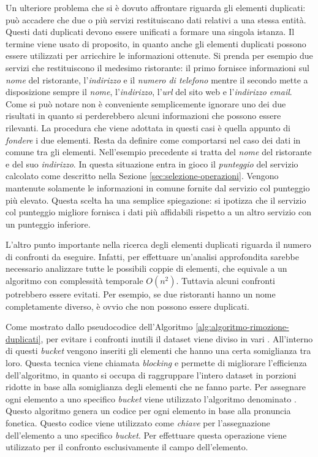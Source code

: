 Un ulteriore problema che si è dovuto affrontare riguarda gli elementi duplicati: può accadere che due o più servizi restituiscano dati relativi a una stessa entità. Questi dati duplicati devono essere unificati a formare una singola istanza. Il termine  viene usato di proposito, in quanto anche gli elementi duplicati possono essere utilizzati per arricchire le informazioni ottenute. Si prenda per esempio due servizi che restituiscono il medesimo ristorante: il primo fornisce informazioni sul \emph{nome} del ristorante, l'\emph{indirizzo} e il \emph{numero di telefono} mentre il secondo mette a disposizione sempre il \emph{nome}, l'\emph{indirizzo}, l'\emph{url} del sito web e l'\emph{indirizzo email}. Come si può notare non è conveniente semplicemente ignorare uno dei due risultati in quanto si perderebbero alcuni informazioni che possono essere rilevanti. La procedura che viene adottata in questi casi è quella appunto di \emph{fondere} i due elementi. Resta da definire come comportarsi nel caso dei dati in comune tra gli elementi. Nell'esempio precedente si tratta del \emph{nome} del ristorante e del suo \emph{indirizzo}. In questa situazione entra in gioco il \emph{punteggio} del servizio calcolato come descritto nella Sezione \ref{sec:selezione-operazioni}. Vengono mantenute solamente le informazioni in comune fornite dal servizio col punteggio più elevato. Questa scelta ha una semplice spiegazione: si ipotizza che il servizio col punteggio migliore fornisca i dati più affidabili rispetto a un altro servizio con un punteggio inferiore.

L'altro punto importante nella ricerca degli elementi duplicati riguarda il numero di confronti da eseguire. Infatti, per effettuare un'analisi approfondita sarebbe necessario analizzare tutte le possibili coppie di elementi, che equivale a un algoritmo con complessità temporale $ O(n^2) $. Tuttavia alcuni confronti potrebbero essere evitati. Per esempio, se due ristoranti hanno un nome completamente diverso, è ovvio che non possono essere duplicati.

Come mostrato dallo pseudocodice dell'Algoritmo \ref{alg:algoritmo-rimozione-duplicati}, per evitare i confronti inutili il dataset viene diviso in vari . All'interno di questi \emph{bucket} vengono inseriti gli elementi che hanno una certa somiglianza tra loro. Questa tecnica viene chiamata \emph{blocking} \cite{elmagarmid2007duplicate} e permette di migliorare l'efficienza dell'algoritmo, in quanto si occupa di raggruppare l'intero dataset in porzioni ridotte in base alla somiglianza degli elementi che ne fanno parte. Per assegnare ogni elemento a uno specifico \emph{bucket} viene utilizzato l'algoritmo denominato  \cite{odell1918soundex}. Questo algoritmo genera un codice per ogni elemento in base alla pronuncia fonetica. Questo codice viene utilizzato come \emph{chiave} per l'assegnazione dell'elemento a uno specifico \emph{bucket}. Per effettuare questa operazione viene utilizzato per il confronto esclusivamente il campo  dell'elemento.

